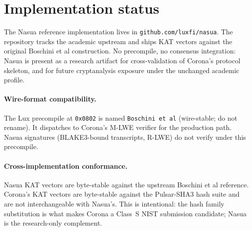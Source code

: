 \documentclass[11pt,a4paper]{article}
\theoremstyle{definition}
\theoremstyle{remark}
\begin{document}
\section{Implementation status}
\label{sec:status}

The Nasua reference implementation lives in
\texttt{github.com/luxfi/nasua}. The repository tracks the academic
upstream and ships KAT vectors against the original Boschini et al
construction. No precompile, no consensus integration: Nasua is
present as a research artifact for cross-validation of Corona's
protocol skeleton, and for future cryptanalysis exposure under the
unchanged academic profile.

\paragraph{Wire-format compatibility.} The Lux precompile at
\texttt{0x0802} is named \texttt{Boschini et al} (wire-stable; do not
rename). It dispatches to Corona's M-LWE verifier for the production
path. Nasua signatures (BLAKE3-bound transcripts, R-LWE) do not
verify under this precompile.

\paragraph{Cross-implementation conformance.} Nasua KAT vectors
are byte-stable against the upstream Boschini et al reference. Corona's
KAT vectors are byte-stable against the Pulsar-SHA3 hash suite and
are not interchangeable with Nasua's. This is intentional: the
hash family substitution is what makes Corona a Class~S NIST
submission candidate; Nasua is the research-only complement.
\end{document}
